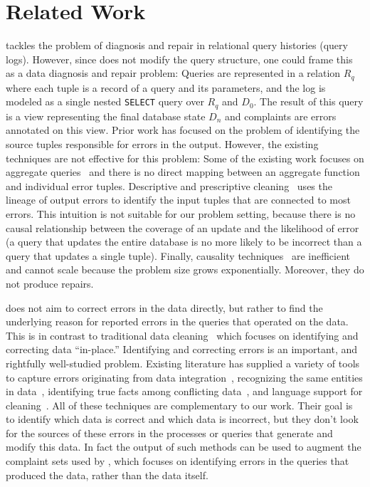 
\section{Related Work}
\label{s:related} 
\sys tackles the problem of diagnosis and repair in relational query
histories (query logs). 
However, since \sys does not modify the query structure, one could
frame this as a data diagnosis and repair problem: Queries are represented in
a relation $R_q$ where each tuple is a record of a query and its parameters,
and the log is modeled as a single nested \texttt{SELECT} query over $R_q$ and
$D_0$. The result of this query is a view representing the final database
state $D_n$ and complaints are errors annotated on this view. Prior work has
focused on the problem of identifying the source tuples responsible for errors
in the output. However, the existing techniques are not effective for this
problem:
Some of the existing work focuses on aggregate queries~\cite{Wu13,
roy2014formal} and there is no direct mapping between an aggregate function
and individual error tuples. Descriptive and prescriptive
cleaning~\cite{chalamalla2014} uses the lineage of output errors to identify
the input tuples that are connected to most errors. This intuition is not
suitable for our problem setting, because there is no causal relationship
between the coverage of an update and the likelihood of error (a query that
updates the entire database is no more likely to be incorrect than a query
that updates a single tuple).
Finally, causality techniques~\cite{meliou2011tracing} are inefficient and
cannot scale because the problem size grows exponentially. Moreover, they do
not produce repairs.

\sys does not aim to correct errors in the data
directly, but rather to find the underlying reason for reported errors
in the queries that operated on the data. 
This is in contrast to
traditional data 
cleaning~\cite{dallachiesa2013nadeef, rahm00, Raman01, Kalashnikov06, Fan2008b
} which focuses on identifying and correcting data
``in-place.'' Identifying and correcting errors is an important, and
rightfully well-studied problem. Existing literature has supplied a
variety of tools to capture errors originating from data
integration~\cite{Abiteboul99
},
recognizing the same entities in data~\cite{Koudas2006, GruenheidDS14
}, identifying true facts among conflicting
data~\cite{yin2008truth, DN09, ltm2012
}, and language support for
cleaning~\cite{Galhardas2000}. All of these techniques are
complementary to our work. Their goal is to identify which data is
correct and which data is incorrect, but they don't look for the
sources of these errors in the processes or queries that generate and
modify this data. In fact the output of such methods can be used to
augment the complaint sets used by \sys, which focuses on identifying
errors in the queries that produced the data, rather than the data
itself.


